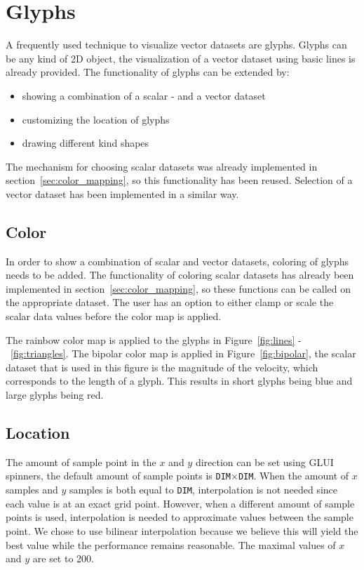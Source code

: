 \section{Glyphs}
	\label{sec:glyphs}
	A frequently used technique to visualize vector datasets are glyphs.
	Glyphs can be any kind of 2D object, the visualization of a vector dataset using basic lines is already provided.
	The functionality of glyphs can be extended by:
	\begin{itemize}
		\item showing a combination of a scalar - and a vector dataset
		\item customizing the location of glyphs
		\item drawing different kind shapes
	\end{itemize}

	The mechanism for choosing scalar datasets was already implemented in section~\ref{sec:color_mapping}, so this functionality has been reused. 
	Selection of a vector dataset has been implemented in a similar way. 

	\subsection{Color}
		In order to show a combination of scalar and vector datasets, coloring of glyphs needs to be added.
		The functionality of coloring scalar datasets has already been implemented in section~\ref{sec:color_mapping}, so these functions can be called on the appropriate dataset.
		The user has an option to either clamp or scale the scalar data values before the color map is applied.
		
		The rainbow color map is applied to the glyphs in Figure~\ref{fig:lines} -~\ref{fig:triangles}.
		The bipolar color map is applied in Figure~\ref{fig:bipolar}, the scalar dataset that is used in this figure is the magnitude of the velocity, which corresponds to the length of a glyph.
		This results in short glyphs being blue and large glyphs being red.  

	\subsection{Location}
		The amount of sample point in the $x$ and $y$ direction can be set using GLUI spinners, the default amount of sample points is \texttt{DIM}$\times$\texttt{DIM}.
		When the amount of $x$ samples and $y$ samples is both equal to \texttt{DIM}, interpolation is not needed since each value is at an exact grid point.
		However, when a different amount of sample points is used, interpolation is needed to approximate values between the sample point.
		We chose to use bilinear interpolation because we believe this will yield the best value while the performance remains reasonable.
		The maximal values of $x$ and $y$ are set to 200.
